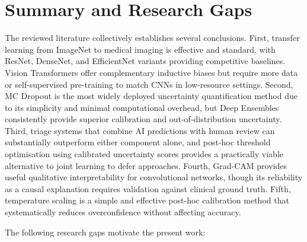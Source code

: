 \section{Summary and Research Gaps}

The reviewed literature collectively establishes several conclusions. First, transfer learning from ImageNet to medical imaging is effective and standard, with ResNet, DenseNet, and EfficientNet variants providing competitive baselines. Vision Transformers offer complementary inductive biases but require more data or self-supervised pre-training to match CNNs in low-resource settings. Second, MC Dropout is the most widely deployed uncertainty quantification method due to its simplicity and minimal computational overhead, but Deep Ensembles consistently provide superior calibration and out-of-distribution uncertainty. Third, triage systems that combine AI predictions with human review can substantially outperform either component alone, and post-hoc threshold optimisation using calibrated uncertainty scores provides a practically viable alternative to joint learning to defer approaches. Fourth, Grad-CAM provides useful qualitative interpretability for convolutional networks, though its reliability as a causal explanation requires validation against clinical ground truth. Fifth, temperature scaling is a simple and effective post-hoc calibration method that systematically reduces overconfidence without affecting accuracy.

The following research gaps motivate the present work:


